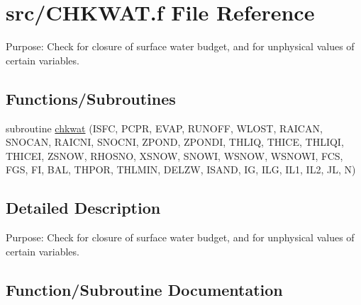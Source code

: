 \hypertarget{CHKWAT_8f}{}\section{src/\+C\+H\+K\+W\+A\+T.f File Reference}
\label{CHKWAT_8f}


Purpose\+: Check for closure of surface water budget, and for unphysical values of certain variables.  


\subsection*{Functions/\+Subroutines}
\begin{DoxyCompactItemize}
\item 
subroutine \hyperlink{CHKWAT_8f_ae24f10ada6d260b942e1b64c3dc5a310}{chkwat} (I\+S\+F\+C, P\+C\+P\+R, E\+V\+A\+P, R\+U\+N\+O\+F\+F, W\+L\+O\+S\+T, R\+A\+I\+C\+A\+N, S\+N\+O\+C\+A\+N, R\+A\+I\+C\+N\+I, S\+N\+O\+C\+N\+I, Z\+P\+O\+N\+D, Z\+P\+O\+N\+D\+I, T\+H\+L\+I\+Q, T\+H\+I\+C\+E, T\+H\+L\+I\+Q\+I, T\+H\+I\+C\+E\+I, Z\+S\+N\+O\+W, R\+H\+O\+S\+N\+O, X\+S\+N\+O\+W, S\+N\+O\+W\+I, W\+S\+N\+O\+W, W\+S\+N\+O\+W\+I, F\+C\+S, F\+G\+S, F\+I, B\+A\+L, T\+H\+P\+O\+R, T\+H\+L\+M\+I\+N, D\+E\+L\+Z\+W, I\+S\+A\+N\+D, I\+G, I\+L\+G, I\+L1, I\+L2, J\+L, N)
\end{DoxyCompactItemize}


\subsection{Detailed Description}
Purpose\+: Check for closure of surface water budget, and for unphysical values of certain variables. 



\subsection{Function/\+Subroutine Documentation}
\hypertarget{CHKWAT_8f_ae24f10ada6d260b942e1b64c3dc5a310}{}
